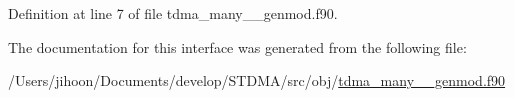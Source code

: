 Definition at line 7 of file tdma\+\_\+many\+\_\+\+\_\+genmod.\+f90.



The documentation for this interface was generated from the following file\+:\begin{DoxyCompactItemize}
\item 
/\+Users/jihoon/\+Documents/develop/\+S\+T\+D\+M\+A/src/obj/\mbox{\hyperlink{tdma__many____genmod_8f90}{tdma\+\_\+many\+\_\+\+\_\+genmod.\+f90}}\end{DoxyCompactItemize}
